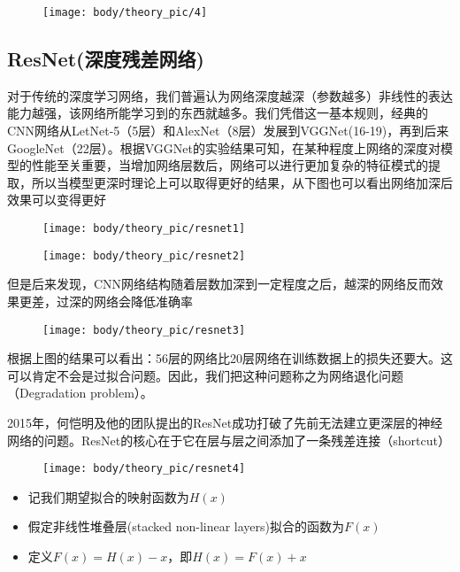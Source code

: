 \begin{figure}[htbp]
\centering
\texttt{[image: body/theory\_pic/4]}
\caption{}
\label{fig::theory6}
\end{figure}

\subsection{ResNet(深度残差网络)}\label{resnetux6df1ux5ea6ux6b8bux5deeux7f51ux7edc}

对于传统的深度学习网络，我们普遍认为网络深度越深（参数越多）非线性的表达能力越强，该网络所能学习到的东西就越多。我们凭借这一基本规则，经典的CNN网络从LetNet-5（5层）和AlexNet（8层）发展到VGGNet(16-19)，再到后来GoogleNet（22层）。根据VGGNet的实验结果可知，在某种程度上网络的深度对模型的性能至关重要，当增加网络层数后，网络可以进行更加复杂的特征模式的提取，所以当模型更深时理论上可以取得更好的结果，从下图也可以看出网络加深后效果可以变得更好

\begin{figure}[htbp]
\centering
\texttt{[image: body/theory\_pic/resnet1]}
\caption{}
\label{fig::theory7}
\end{figure}

\begin{figure}[htbp]
\centering
\texttt{[image: body/theory\_pic/resnet2]}
\caption{}
\label{fig::theory8}
\end{figure}

但是后来发现，CNN网络结构随着层数加深到一定程度之后，越深的网络反而效果更差，过深的网络会降低准确率

\begin{figure}[htbp]
\centering
\texttt{[image: body/theory\_pic/resnet3]}
\caption{}
\label{fig::theory9}
\end{figure}

根据上图的结果可以看出：56层的网络比20层网络在训练数据上的损失还要大。这可以肯定不会是过拟合问题。因此，我们把这种问题称之为网络退化问题（Degradation
problem）。

2015年，何恺明及他的团队提出的ResNet成功打破了先前无法建立更深层的神经网络的问题。ResNet的核心在于它在层与层之间添加了一条残差连接（shortcut）

\begin{figure}[htbp]
\centering
\texttt{[image: body/theory\_pic/resnet4]}
\caption{}
\label{fig::theory10}
\end{figure}

\begin{itemize}
\tightlist
\item
  记我们期望拟合的映射函数为\(H(x)\)
\item
  假定非线性堆叠层(stacked non-linear layers)拟合的函数为\(F(x)\)
\item
  定义\(F(x) = H(x) - x\)，即\(H(x) = F(x) + x\)
\end{itemize}

